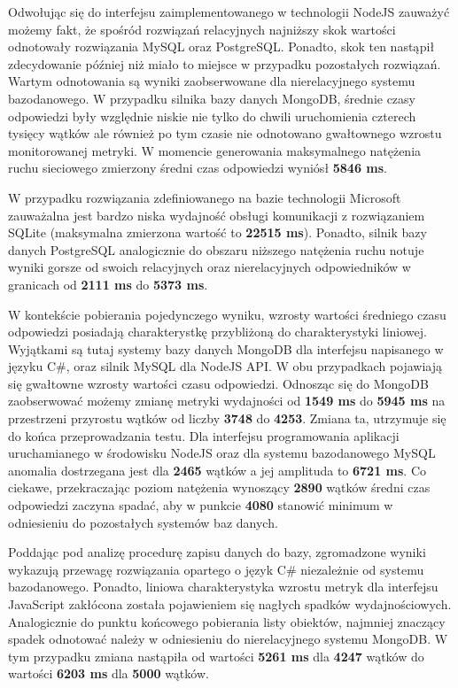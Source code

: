 Odwołując się do interfejsu zaimplementowanego w technologii NodeJS zauważyć możemy fakt, że spośród rozwiązań relacyjnych najniższy skok wartości odnotowały rozwiązania MySQL oraz PostgreSQL. Ponadto, skok ten nastąpił zdecydowanie później niż miało to miejsce w przypadku pozostałych rozwiązań. Wartym odnotowania są wyniki zaobserwowane dla nierelacyjnego systemu bazodanowego. W przypadku silnika bazy danych MongoDB, średnie czasy odpowiedzi były względnie niskie nie tylko do chwili uruchomienia czterech tysięcy wątków ale również po tym czasie nie odnotowano gwałtownego wzrostu monitorowanej metryki. W momencie generowania maksymalnego natężenia ruchu sieciowego zmierzony średni czas odpowiedzi wyniósł \textbf{5846 ms}.

W przypadku rozwiązania zdefiniowanego na bazie technologii Microsoft zauważalna jest bardzo niska wydajność obsługi komunikacji z rozwiązaniem SQLite (maksymalna zmierzona wartość to \textbf{22515 ms}). Ponadto, silnik bazy danych PostgreSQL analogicznie do obszaru niższego natężenia ruchu notuje wyniki gorsze od swoich relacyjnych oraz nierelacyjnych odpowiedników w granicach od \textbf{2111 ms} do \textbf{5373 ms}.

W kontekście pobierania pojedynczego wyniku, wzrosty wartości średniego czasu odpowiedzi posiadają charakterystkę przybliżoną do charakterystyki liniowej. Wyjątkami są tutaj systemy bazy danych MongoDB dla interfejsu napisanego w języku C\#, oraz silnik MySQL dla NodeJS API. W obu przypadkach pojawiają się gwałtowne wzrosty wartości czasu odpowiedzi. Odnosząc się do MongoDB zaobserwować możemy zmianę metryki wydajności od \textbf{1549 ms} do \textbf{5945 ms} na przestrzeni przyrostu wątków od liczby \textbf{3748} do \textbf{4253}. Zmiana ta, utrzymuje się do końca przeprowadzania testu. Dla interfejsu programowania aplikacji uruchamianego w środowisku NodeJS oraz dla systemu bazodanowego MySQL anomalia dostrzegana jest dla \textbf{2465} wątków a jej amplituda to \textbf{6721 ms}. Co ciekawe, przekraczając poziom natężenia wynoszący \textbf{2890} wątków średni czas odpowiedzi zaczyna spadać, aby w punkcie \textbf{4080} stanowić minimum w odniesieniu do pozostałych systemów baz danych.

Poddając pod analizę procedurę zapisu danych do bazy, zgromadzone wyniki wykazują przewagę rozwiązania opartego o język C\# niezależnie od systemu bazodanowego. Ponadto, liniowa charakterystyka wzrostu metryk dla interfejsu JavaScript zakłócona została pojawieniem się nagłych spadków wydajnościowych. Analogicznie do punktu końcowego pobierania listy obiektów, najmniej znaczący spadek odnotować należy w odniesieniu do nierelacyjnego systemu MongoDB. W tym przypadku zmiana nastąpiła od wartości \textbf{5261 ms} dla \textbf{4247} wątków do wartości \textbf{6203 ms} dla \textbf{5000} wątków.
    
